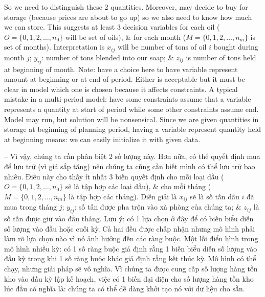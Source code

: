 \documentclass{article}
\begin{document}
\begin{itemize}
\begin{itemize}
\begin{itemize}
\begin{itemize}
                So we need to distinguish these 2 quantities. Moreover, may decide to buy for storage (because prices are about to go up) so we also need to know how much we can store. This suggests at least 3 decision variables for each oil ($O = \{0,1,2,\ldots,n_0\}$ will be set of oils), \& for each month ($M = \{0,1,2,\ldots,n_m\}$ is set of months). Interpretation is $x_{ij}$ will be number of tons of oil $i$ bought during month $j$; $y_{ij}$: number of tons blended into our soap; \& $z_{ij}$ is number of tons held at beginning of month. Note: have a choice here to have variable represent amount at beginning or at end of period. Either is acceptable but it must be clear in model which one is chosen because it affects constraints. A typical mistake in a multi-period model: have some constraints assume that a variable represents a quantity at start of period while some other constraints assume end. Model may run, but solution will be nonsensical. Since we are given quantities in storage at beginning of planning period, having a variable represent quantity held at beginning means: we can easily initialize it with given data.

                -- Vì vậy, chúng ta cần phân biệt 2 số lượng này. Hơn nữa, có thể quyết định mua để lưu trữ (vì giá sắp tăng) nên chúng ta cũng cần biết mình có thể lưu trữ bao nhiêu. Điều này cho thấy ít nhất 3 biến quyết định cho mỗi loại dầu ($O = \{0,1,2,\ldots,n_0\}$ sẽ là tập hợp các loại dầu), \& cho mỗi tháng ($M = \{0,1,2,\ldots,n_m\}$ là tập hợp các tháng). Diễn giải là $x_{ij}$ sẽ là số tấn dầu $i$ đã mua trong tháng $j$; $y_{ij}$: số tấn được pha trộn vào xà phòng của chúng ta; \& $z_{ij}$ là số tấn được giữ vào đầu tháng. Lưu ý: có 1 lựa chọn ở đây để có biến biểu diễn số lượng vào đầu hoặc cuối kỳ. Cả hai đều được chấp nhận nhưng mô hình phải làm rõ lựa chọn nào vì nó ảnh hưởng đến các ràng buộc. Một lỗi điển hình trong mô hình nhiều kỳ: có 1 số ràng buộc giả định rằng 1 biến biểu diễn số lượng vào đầu kỳ trong khi 1 số ràng buộc khác giả định rằng kết thúc kỳ. Mô hình có thể chạy, nhưng giải pháp sẽ vô nghĩa. Vì chúng ta được cung cấp số lượng hàng tồn kho vào đầu kỳ lập kế hoạch, việc có 1 biến đại diện cho số lượng hàng tồn kho lúc đầu có nghĩa là: chúng ta có thể dễ dàng khởi tạo nó với dữ liệu cho sẵn.


\end{itemize}
\end{itemize}
\end{itemize}
\end{itemize}
\end{document}
